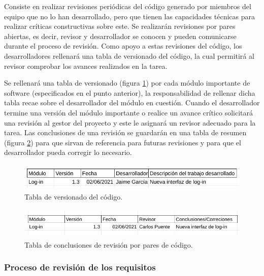 \documentclass{article}
\begin{document}
Consiste en realizar revisiones periódicas del código generado por miembros del equipo que no lo han desarrollado, pero que tienen las capacidades técnicas para realizar críticas constructivas sobre este. Se realizarán revisiones por pares abiertas, es decir, revisor y desarrollador se conocen y pueden comunicarse durante el proceso de revisión. Como apoyo a estas revisiones del código, los desarrolladores rellenará una tabla de versionado del código, la cual permitirá al revisor comprobar los avances realizados en la tarea.

Se rellenará una tabla de versionado (figura \ref{tablaVersionado}) por cada módulo importante de software (especificados en el punto anterior), la responsabilidad de rellenar dicha tabla recae sobre el desarrollador del módulo en cuestión. Cuando el desarrollador termine una versión del módulo importante o realice un avance crítico solicitará una revisión al gestor del proyecto y este le asignará un revisor adecuado para la tarea. Las conclusiones de una revisión se guardarán en una tabla de resumen (figura \ref{tablaConclusionesPares}) para que sirvan de referencia para futuras revisiones y para que el desarrollador pueda corregir lo necesario.

\begin{figure}[H]
   \centering
       \includegraphics[height=1.3cm]{../images/tabla_versionado_code.png}
   \caption{Tabla de versionado del código.}
   \label{tablaVersionado}
\end{figure}

\begin{figure}[H]
   \centering
       \includegraphics[height=1.5cm]{../images/tabla_conclusiones_revision_pares.png}
   \caption{Tabla de conclusiones de revisión por pares de código.}
   \label{tablaConclusionesPares}
\end{figure}

\subsubsection{Proceso de revisión de los requisitos} \label{P.EC.13}
\end{document}
